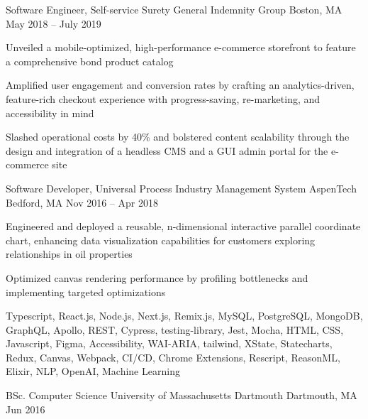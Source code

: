 \documentclass[]{awesome-cv}
\begin{document}
\begin{cventries}
{\begin{cvitems}
		\end{cvitems}}
	\cventry
	{Software Engineer, Self-service Surety}
	{General Indemnity Group}
	{Boston, MA}
	{May 2018 – July 2019}
	{\begin{cvitems}
		\item {Unveiled a mobile-optimized, high-performance e-commerce storefront to feature a comprehensive bond product catalog}
		\item {Amplified user engagement and conversion rates by crafting an analytics-driven, feature-rich checkout experience with progress-saving, re-marketing, and accessibility in mind}
		\item {Slashed operational costs by 40\% and bolstered content scalability through the design and integration of a headless CMS and a GUI admin portal for the e-commerce site}
		\end{cvitems}}
	\cventry
	{Software Developer, Universal Process Industry Management System} 
	{AspenTech}
	{Bedford, MA}
	{Nov 2016 – Apr 2018}
	{\begin{cvitems}
		\item {Engineered and deployed a reusable, n-dimensional interactive parallel coordinate chart, enhancing data visualization capabilities for customers exploring relationships in oil properties}
		\item {Optimized canvas rendering performance by profiling bottlenecks and implementing targeted optimizations}
		\end{cvitems}}
\end{cventries}

\vspace{-2mm}

Typescript, React.js, Node.js, Next.js, Remix.js, MySQL, PostgreSQL, MongoDB, GraphQL, Apollo, REST, Cypress, testing-library, Jest, Mocha, HTML, CSS, Javascript, Figma, Accessibility, WAI-ARIA, tailwind, XState, Statecharts, Redux, Canvas, Webpack, CI/CD, Chrome Extensions, Rescript, ReasonML, Elixir, NLP, OpenAI, Machine Learning

\begin{cvhonors}
	\cvhonor
	{BSc. Computer Science}
	{University of Massachusetts Dartmouth}
	{Dartmouth, MA}
	{Jun 2016}
\end{cvhonors}
\end{document}
